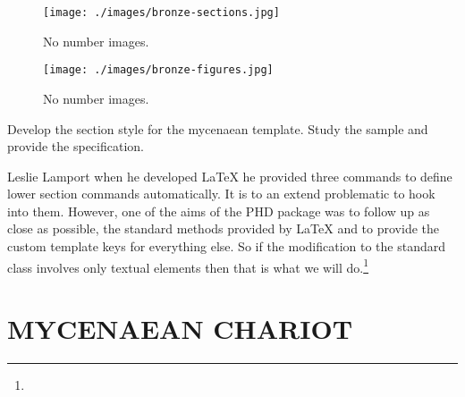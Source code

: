 \begin{figure}[ht]
\centering
\texttt{[image: ./images/bronze-sections.jpg]}
\caption{No number images.}
\end{figure}



\begin{figure}[ht]
\centering
\texttt{[image: ./images/bronze-figures.jpg]}
\caption{No number images.}
\end{figure}

\makeatletter
   \makeatletter
 

       
\lorem 


\everypar{}    



\example
Develop the section style for the mycenaean template. Study the sample and
provide the specification.
     
 Leslie Lamport when he developed LaTeX he provided three commands to define lower section commands automatically. It is to an extend problematic to hook into them. However, one of the
aims of the PHD package was to follow up as close as possible, the standard methods provided
by LaTeX and to provide the custom template keys for everything else. So if the modification
to the standard class involves only textual elements then that is what we will do.\footnote{\protect\lorem} 
 \makeatletter


\let\oldseccntformat\@seccntformat       
 \def\@seccntformat#1{\protect\makebox[0pt][l]{\csname the#1\endcsname}}
\def\thesection{%
   \raisebox{-6.5pt}{\tikzrule}%
}%
\let\oldchapter\thechapter
\def\thechapter{\@gobble}   
\makeatother
               
\section{MYCENAEAN CHARIOT}

